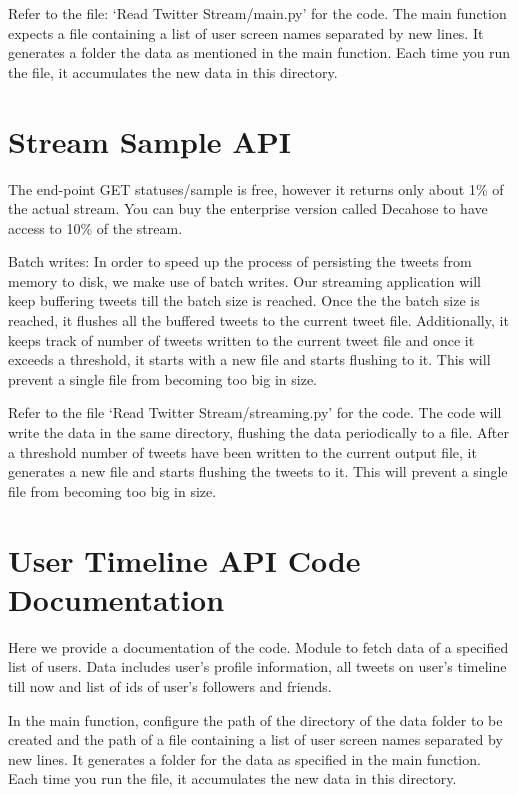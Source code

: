 \documentclass[letterpaper,10pt,english]{sphinxmanual}
\begin{document}
Refer to the file: ‘Read Twitter Stream/main.py’ for the code. The main function expects a file containing a list of user screen names separated by new lines. It generates a folder the data as mentioned in the main function. Each time you run the file, it accumulates the new data in this directory.


\section{Stream Sample API}
\label{\detokenize{twitter_stream:stream-sample-api}}
The end-point GET statuses/sample is free, however it returns only about 1\% of the actual stream. You can buy the enterprise version called Decahose to have access to 10\% of the stream.

Batch writes: In order to speed up the process of persisting the tweets from memory to disk, we make use of batch writes. Our streaming application will keep buffering tweets till the batch size is reached. Once the the batch size is reached, it flushes all the buffered tweets to the current tweet file. Additionally, it keeps track of number of tweets written to the current tweet file and once it exceeds a threshold, it starts with a new file and starts flushing to it. This will prevent a single file from becoming too big in size.

Refer to the file ‘Read Twitter Stream/streaming.py’ for the code. The code will write the data in the same directory, flushing the data periodically to a file. After a threshold number of tweets have been written to the current output file, it generates a new file and starts flushing the tweets to it. This will prevent a single file from becoming too big in size.


\section{User Timeline API Code Documentation}
\label{\detokenize{twitter_stream:user-timeline-api-code-documentation}}
Here we provide a documentation of the code.
\label{\detokenize{twitter_stream:module-userstimeline}}
Module to fetch data of a specified list of users. Data includes user’s profile information, all tweets on
user’s timeline till now and list of ids of user’s followers and friends.

In the main function, configure the path of the directory of the data folder to be created and the path of a file containing
a list of user screen names separated by new lines. It generates a folder for the data as specified in the main function.
Each time you run the file, it accumulates the new data in this directory.
\end{document}

